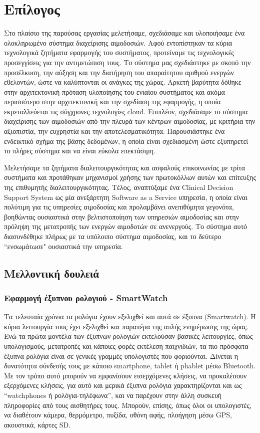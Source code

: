 \chapter{Επίλογος}\label{ch:conclusion}

		Στο πλαίσιο της παρούσας εργασίας μελετήσαμε, σχεδιάσαμε και υλοποιήσαμε ένα ολοκληρωμένο σύστημα διαχείρισης αιμοδοσιών. Αφού εντοπίστηκαν τα κύρια τεχνολογικά ζητήματα εφαρμογής του συστήματος, προτείναμε τις τεχνολογικές προσεγγίσεις για την αντιμετώπιση τους. Το σύστημα μας σχεδιάστηκε με σκοπό την προσέλκυση, την αύξηση και την διατήρηση του απαραίτητου αριθμού ενεργών εθελοντών, ώστε να καλύπτονται οι ανάγκες της χώρας. Αρκετή βαρύτητα δόθηκε στην αρχιτεκτονική πρόταση υλοποίησης του ενιαίου συστήματος και ακόμα περισσότερο στην αρχιτεκτονική και την σχεδίαση της εφαρμογής, η οποία εκμεταλλεύεται τις σύγχρονες τεχνολογίες cloud. Επιπλέον, σχεδιάσαμε το σύστημα διαχείρισης των αιμοδοσιών από την πλευρά των κέντρων αιμοδοσίας, με κριτήρια την αξιοπιστία, την ευχρηστία και την αποτελεσματικότητα. Παρουσιάστηκε ένα ενδεικτικό σχήμα της βάσης δεδομένων, η οποία είναι σχεδιασμένη ώστε εξυπηρετεί το πλήρες σύστημα και να είναι εύκολα επεκτάσιμη.
		
		Μελετήσαμε τα ζητήματα διαλειτουργικότητας και ασφαλούς επικοινωνίας με τρίτα συστήματα και προτάθηκαν μηχανισμοί χρήσης των πρωτοκόλλων αυτών και επίτευξης της επιθυμητής διαλειτουργικότητας. Τέλος, αναπτύξαμε ένα Clinical Decision Support System ως μία ανεξάρτητη Software as a Service υπηρεσία, η οποία είναι πολύτιμη για τις υπηρεσίες αιμοδοσίας και προλαμβάνει ανεπιθύμητα γεγονότα, βοηθώντας ουσιαστικά στην βελτιστοποίηση των υπηρεσιών αιμοδοσίας και στην πρόληψη  της μετατροπής των ενεργών αιμοδοτών σε ανενεργούς. Το σύστημα αυτό διασυνδέθηκε πλήρως με τα υπόλοιπο σύστημα αιμοδοσίας, και το δεύτερο ``ενσωμάτωσε" ουσιαστικά την υπηρεσία.
		
\section{Μελλοντική δουλειά}
	\subsection{Εφαρμογή έξυπνου ρολογιού - SmartWatch}
	
	
		Τα τελευταία χρόνια τα ρολόγια έχουν εξελιχθεί και αυτά σε έξυπνα (Smartwatch). Η κύρια λειτουργία τους έχει εξελιχθεί και παραπέρα της απλής ενημέρωσης της ώρας. Ενώ τα πρώτα μοντέλα των έξυπνων ρολογιών εκτελούσαν βασικές λειτουργίες, όπως υπολογισμούς, μετατροπές και κάποιες φορές εκτέλεση παιχνιδιών, τα πιο πρόσφατα έξυπνα ρολόγια είναι σε γενικές γραμμές υπολογιστές που φοριούνται. Δίνεται η δυνατότητα σύνδεσής τους με κάποιο smartphone, tablet ή phablet μέσω Bluetooth. Με τον τρόπο αυτό μπορούν να εμφανίσουν εισερχόμενες κλήσεις, να προκαλέσουν εξερχόμενες κλήσεις, για αυτό και μερικά έξυπνα ρολόγια χαρακτηρίζονται και ως “watchphones ή ρολόγια-τηλέφωνα”, και να παρέχουν στην άλλη συσκευή πληροφορίες από τους αισθητήρες τους. Μπορούν, επίσης, όπως όλοι οι υπολογιστές, να διαθέτουν κάμερα, θερμόμετρο, πυξίδα, οθόνη αφής, πλοήγηση μέσω GPS, ακουστικά, κάρτες SD.	
	
